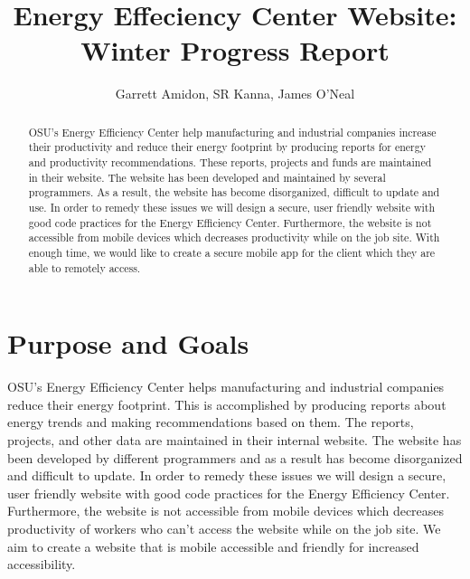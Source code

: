 \documentclass[letterpaper,10pt,titlepage,journal,compsoc,draftclsnofoot,onecolumn]{IEEEtran}
\title{Energy Effeciency Center Website: \\ Winter Progress Report}
\author{Garrett Amidon, SR Kanna, James O'Neal}
\newcommand\tab[1][1cm]{\hspace*{#1}}
\begin{document}
\begin{titlingpage}
    \maketitle
	\centering{}
    \begin{abstract}
        
        OSU’s Energy Efficiency Center help manufacturing and industrial companies increase their productivity and reduce their energy footprint by producing reports for energy and productivity recommendations. These reports, projects and funds are maintained in their website. The website has been developed and maintained by several programmers. As a result, the website has become disorganized, difficult to update and use. In order to remedy these issues we will design a secure, user friendly website with good code practices for the Energy Efficiency Center. 	Furthermore, the website is not accessible from mobile devices which decreases productivity while on the job site. With enough time, we would like to create a secure mobile app for the client which they are able to remotely access.
        
    \end{abstract}
\end{titlingpage}

\newpage

\tableofcontents{}

\newpage


\section{Purpose and Goals}

\tab OSU’s Energy Efficiency Center helps manufacturing and industrial companies reduce their energy footprint. This is accomplished by producing reports about energy trends and making recommendations based on them. The reports, projects, and other data are maintained in their internal website. The website has been developed by different programmers and as a result has become disorganized and difficult to update. In order to remedy these issues we will design a secure, user friendly website with good code practices for the Energy Efficiency Center. Furthermore, the website is not accessible from mobile devices which decreases productivity of workers who can’t access the website while on the job site. We aim to create a website that is mobile accessible and friendly for increased accessibility.
\end{document}
